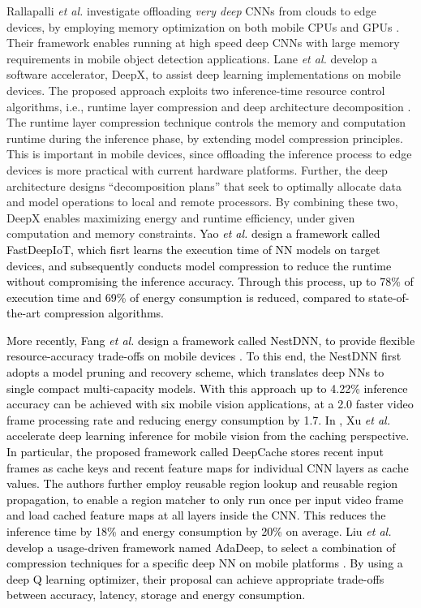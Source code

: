 \documentclass[journal,comsoc,letter]{IEEEtran}
\newcommand{\rev}[1]{\textcolor{black}{#1}}
\begin{document}
Rallapalli \emph{et al.} investigate offloading \emph{very deep} CNNs from clouds to edge devices, by employing memory optimization on both mobile CPUs and GPUs \cite{rallapalli2016very}. Their framework enables running at high speed deep CNNs with large memory requirements in mobile object detection applications. Lane \emph{et al.} develop a software accelerator, DeepX, to assist deep learning implementations on mobile devices. The proposed approach exploits two inference-time resource control algorithms, i.e., runtime layer compression and deep architecture decomposition \cite{lane2016deepx}. The runtime layer compression technique controls the memory and computation runtime during the inference phase, by extending model compression principles. This is important in mobile devices, since offloading the inference process to edge devices is more practical with current hardware platforms. Further, the deep architecture designs ``decomposition plans'' that seek to optimally allocate data and model operations to local and remote processors. By combining these two, DeepX enables maximizing energy and runtime efficiency, under given computation and memory constraints. \rev{Yao \emph{et al.} \cite{yao2018fastdeepiot} design a framework called FastDeepIoT, which fisrt learns the execution time of NN models on target devices, and subsequently conducts model compression to reduce the runtime without compromising the inference accuracy. Through this process, up to
78\% of execution time and 69\% of energy consumption is reduced, compared to state-of-the-art compression algorithms.}

\rev{More recently, Fang \emph{et al.} design a framework called NestDNN, to provide flexible resource-accuracy trade-offs on mobile devices \cite{fang2018nestdnn}. To this end, the NestDNN first adopts a model pruning and recovery scheme, which  translates deep NNs to single compact multi-capacity models. With this approach up to 4.22\% inference accuracy can be achieved with six mobile vision applications, at a 2.0 faster video frame processing rate and reducing energy consumption by 1.7. In \cite{xu2018deepcache}, Xu \emph{et al.} accelerate deep learning inference for mobile vision from the caching perspective. In particular, the proposed framework called DeepCache stores recent input frames as cache keys and recent feature maps for individual CNN layers as cache values. The authors further employ reusable region lookup and reusable region propagation, to enable a region matcher to only run once per input video frame and load cached feature maps at all layers inside the CNN. This reduces the inference time by 18\% and energy consumption by 20\% on average. Liu \emph{et al.} develop a usage-driven framework named AdaDeep, to select a combination of compression techniques for a specific deep NN on mobile platforms \cite{liu2018ondemand}. By using a deep Q learning optimizer, their proposal can achieve appropriate trade-offs between accuracy, latency, storage and energy consumption.} 
\end{document}
